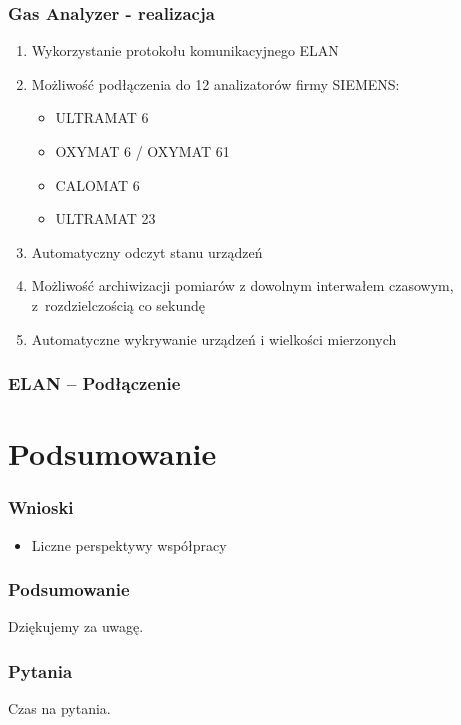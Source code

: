 \documentclass[ucs]{beamer}
\begin{document}
\begin{frame}
\frametitle{Gas Analyzer - realizacja}
\begin{enumerate}
\item Wykorzystanie protokołu komunikacyjnego ELAN
\item Możliwość podłączenia do 12 analizatorów firmy SIEMENS:
\begin{itemize}
\item ULTRAMAT 6
\item OXYMAT 6 / OXYMAT 61
\item CALOMAT 6
\item ULTRAMAT 23
\end{itemize}
\item Automatyczny odczyt stanu urządzeń
\item Możliwość archiwizacji pomiarów z dowolnym interwałem czasowym, z~rozdzielczością co sekundę
\item Automatyczne wykrywanie urządzeń i wielkości mierzonych
\end{enumerate}
\end{frame}

\begin{frame}
\frametitle{ELAN -- Podłączenie}

\end{frame}

\section{Podsumowanie}
\begin{frame}
\frametitle{Wnioski}
\begin{itemize}
\item Liczne perspektywy współpracy
\end{itemize}
\end{frame}

\begin{frame}
\frametitle{Podsumowanie}
Dziękujemy za uwagę.
\end{frame}

\begin{frame}
\frametitle{Pytania}
Czas na pytania.
\end{frame}
\end{document}
